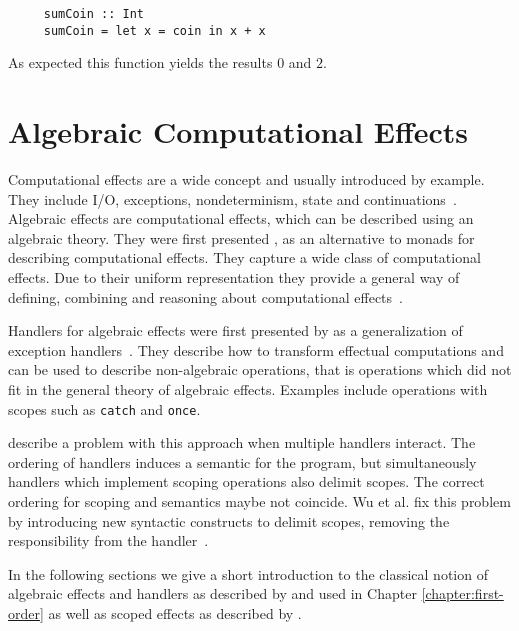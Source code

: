 \begin{verbatim}
     sumCoin :: Int
     sumCoin = let x = coin in x + x
\end{verbatim}
As expected this function yields the results $0$ and $2$.


\section{Algebraic Computational Effects}

Computational effects are a wide concept and usually introduced by example.
They include I/O, exceptions, nondeterminism, state and
continuations~\cite{DBLP:conf/fossacs/PlotkinP02,DBLP:journals/corr/abs-1807-05923}.
Algebraic effects are computational effects, which can be described using an
algebraic theory.
They were first presented \textcite{DBLP:conf/fossacs/PlotkinP02}, as an
alternative to monads for describing computational effects.
They capture a wide class of computational effects.
Due to their uniform representation they provide a general way of defining,
combining and reasoning about computational
effects~\cite{DBLP:journals/corr/PlotkinP13}.

Handlers for algebraic effects were first presented by
\citeauthor{DBLP:conf/esop/PlotkinP09} as a generalization of exception
handlers~\cite{DBLP:conf/esop/PlotkinP09}.
They describe how to transform effectual computations and can be used to
describe non-algebraic operations, that is operations which did not fit in the
general theory of algebraic effects.
Examples include operations with scopes such as \texttt{catch} and
\texttt{once}.

\textcite{DBLP:conf/haskell/WuSH14} describe a problem with this approach when
multiple handlers interact.
The ordering of handlers induces a semantic for the program, but simultaneously
handlers which implement scoping operations also delimit scopes.
The correct ordering for scoping and semantics maybe not coincide.
Wu et al. fix this problem by introducing new syntactic constructs to delimit
scopes, removing the responsibility from the
handler~\cite{DBLP:conf/haskell/WuSH14,DBLP:conf/lics/PirogSWJ18}.

In the following sections we give a short introduction to the classical notion
of algebraic effects and handlers as described by
\textcite{DBLP:journals/corr/abs-1807-05923} and used in Chapter
\ref{chapter:first-order} as well as scoped effects as described by
\textcite{DBLP:conf/haskell/WuSH14}.


